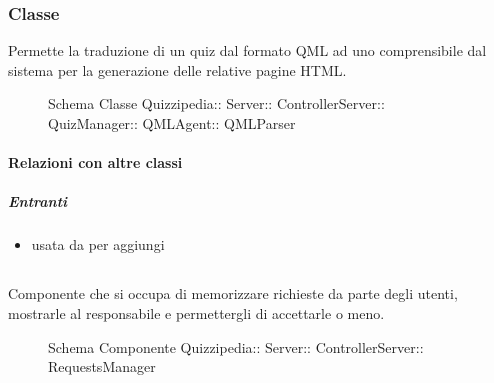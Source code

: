 \subsubsection{Classe }
Permette la traduzione di un quiz dal formato QML ad uno comprensibile dal sistema per la generazione delle relative pagine HTML.
\begin{figure}[H]
\centering
\noindent{}
\caption[Schema Classe QMLParser]{Schema Classe Quizzipedia:: Server:: ControllerServer:: QuizManager:: QMLAgent:: QMLParser}
\end{figure}
\paragraph{Relazioni con altre classi}
\subparagraph{Entranti}
\begin{itemize}
\item usata da  per aggiungi
\end{itemize}
\subsection{}
Componente che si occupa di memorizzare richieste da parte degli utenti, mostrarle al responsabile e permettergli di accettarle o meno.
\begin{figure}[H]
\centering
\noindent{}
\caption[Schema Componente RequestsManager]{Schema Componente Quizzipedia:: Server:: ControllerServer:: RequestsManager}
\end{figure}
